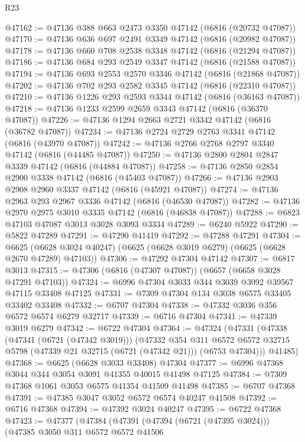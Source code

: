 \begin{lexlean}{R23}
\begin{coremodule}
@47162 := @47136 @388 @663 @2473 @3350 @47142 (@6816 (@20732 @47087))
@47170 := @47136 @636 @697 @2491 @3349 @47142 (@6816 (@20982 @47087))
@47178 := @47136 @660 @708 @2538 @3348 @47142 (@6816 (@21294 @47087))
@47186 := @47136 @684 @293 @2549 @3347 @47142 (@6816 (@21588 @47087))
@47194 := @47136 @693 @2553 @2570 @3346 @47142 (@6816 (@21868 @47087))
@47202 := @47136 @702 @293 @2582 @3345 @47142 (@6816 (@22310 @47087))
@47210 := @47136 @1226 @293 @2593 @3344 @47142 (@6816 (@36163 @47087))
@47218 := @47136 @1233 @2599 @2659 @3343 @47142 (@6816 (@36370 @47087))
@47226 := @47136 @1294 @2663 @2721 @3342 @47142 (@6816 (@36782 @47087))
@47234 := @47136 @2724 @2729 @2763 @3341 @47142 (@6816 (@43970 @47087))
@47242 := @47136 @2766 @2768 @2797 @3340 @47142 (@6816 (@44485 @47087))
@47250 := @47136 @2800 @2804 @2847 @3339 @47142 (@6816 (@44884 @47087))
@47258 := @47136 @2850 @2854 @2900 @3338 @47142 (@6816 (@45403 @47087))
@47266 := @47136 @2903 @2908 @2960 @3337 @47142 (@6816 (@45921 @47087))
@47274 := @47136 @2963 @293 @2967 @3336 @47142 (@6816 (@46530 @47087))
@47282 := @47136 @2970 @2975 @3010 @3335 @47142 (@6816 (@46838 @47087))
@47288 := @6823 @47103 @47087 @3013 @3028 @3093 @3334
@47289 := @6240 @5922
@47290 := @5822 @47289
@47291 := @47290 @41419
@47292 := @47288 @47291
@47304 := @6625 (@6628 @3024 @40247) (@6625 (@6628 @3019 @6279) (@6625 (@6628 @2670 @47289) @47103))
@47306 := @47292 @47304 @47142
@47307 := @6817 @3013
@47315 := @47306 (@6816 (@47307 @47087)) (@6657 (@6658 @3028 @47291 @47103))
@47324 := @6996 @47304 @3033 @344 @3039 @3092 @39567 @47115 @33408 @47125
@47331 := @7309 @47304 @134 @3038 @6575 @33405 @33402 @33408
@47332 := @6707 @47304
@47338 := @47332 @3036 @356 @6572 @6574 @6279 @32717
@47339 := @6716 @47304
@47341 := @47339 @3019 @6279
@47342 := @6722 @47304
@47364 := @47324
    (@47331
      (@47338
        (@47341 (@6721 (@47342 @3019)))
        (@47332
          @354
          @311
          @6572
          @6572
          @32715
          @5798
          (@47339 @21 @32715 (@6721 (@47342 @21)))
          (@6753 @47304)))
      @41485)
@47368 := @6625 (@6628 @3033 @33408) @47304
@47377 := @6996 @47368 @3044 @344 @3054 @3091 @41355 @40015 @41498 @47125
@47384 := @7309 @47368 @1061 @3053 @6575 @41354 @41509 @41498
@47385 := @6707 @47368
@47391 := @47385 @3047 @3052 @6572 @6574 @40247 @41508
@47392 := @6716 @47368
@47394 := @47392 @3024 @40247
@47395 := @6722 @47368
@47423 := @47377
    (@47384
      (@47391
        (@47394 (@6721 (@47395 @3024)))
        (@47385
          @3050
          @311
          @6572
          @6572
          @41506

\end{coremodule}
\end{lexlean}
